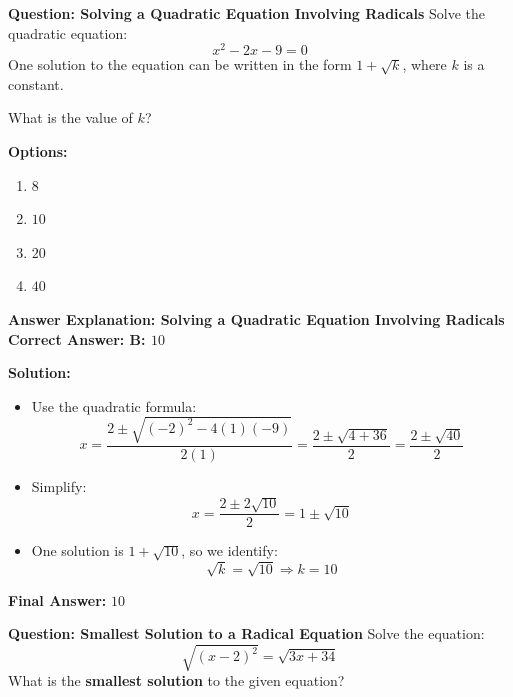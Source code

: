 \documentclass{beamer}
\begin{document}
\begin{frame}{\textbf{Question: Solving a Quadratic Equation Involving Radicals}}
    Solve the quadratic equation:
    \[
    x^2 - 2x - 9 = 0
    \]
    One solution to the equation can be written in the form \(1 + \sqrt{k}\), where \(k\) is a constant.

    \vspace{0.3cm}
    What is the value of \(k\)?

    \vspace{0.5cm}
    \textbf{Options:}
    \begin{enumerate}
        \item[A] \(8\)
        \item[B] \(10\)
        \item[C] \(20\)
        \item[D] \(40\)
    \end{enumerate}
\end{frame}

\begin{frame}{\textbf{Answer Explanation: Solving a Quadratic Equation Involving Radicals}}
    \textbf{Correct Answer: \textcolor{novelGreen}{B: \(10\)}}

    \vspace{0.3cm}
    \textbf{Solution:}
    \begin{itemize}
        \item Use the quadratic formula:
        \[
        x = \frac{2 \pm \sqrt{(-2)^2 - 4(1)(-9)}}{2(1)} = \frac{2 \pm \sqrt{4 + 36}}{2} = \frac{2 \pm \sqrt{40}}{2}
        \]
        \item Simplify:
        \[
        x = \frac{2 \pm 2\sqrt{10}}{2} = 1 \pm \sqrt{10}
        \]
        \item One solution is \(1 + \sqrt{10}\), so we identify:
        \[
        \sqrt{k} = \sqrt{10} \Rightarrow k = 10
        \]
    \end{itemize}

    \textbf{Final Answer:} \( \boxed{10} \)
\end{frame}



\begin{frame}{\textbf{Question: Smallest Solution to a Radical Equation}}
Solve the equation:
\[
\sqrt{(x - 2)^2} = \sqrt{3x + 34}
\]
What is the \textbf{smallest solution} to the given equation?
\end{frame}
\end{document}
